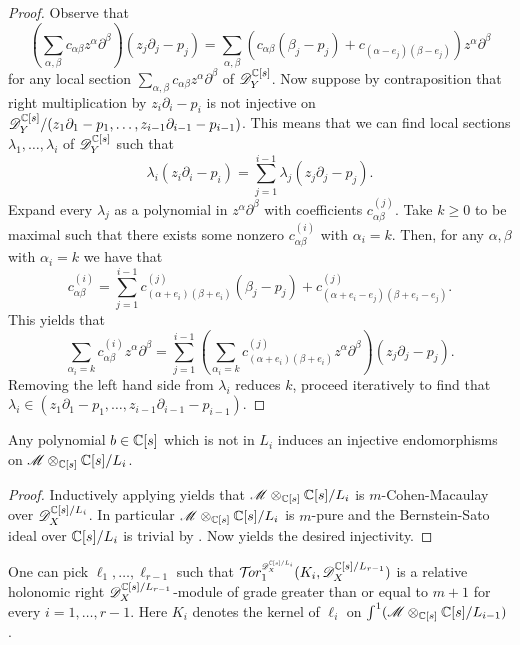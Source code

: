 \begin{proof}
  Observe that
  $$(\sum_{\alpha,\beta} c_{\alpha \beta}z^{\alpha}\partial^{\beta})(z_j\partial_j - p_j) = \sum_{\alpha,\beta} (c_{\alpha \beta}(\beta_j - p_j) + c_{(\alpha - e_j)(\beta - e_j)}) z^\alpha\partial^{\beta}  $$
  for any local section $\sum_{\alpha,\beta} c_{\alpha \beta}z^{\alpha}\partial^{\beta}$ of $\mathscr{D}_Y^{\mathbb{C}[s]}$.
  Now suppose by contraposition that right multiplication by $z_i\partial_i - p_i$ is not injective on $\mathscr{D}_Y^{\mathbb{C}[s]}/(z_1\partial_1 - p_1,\ldots, z_{i-1}\partial_{i-1} - p_{i-1} )$.
  This means that we can find local sections $\lambda_1,\ldots, \lambda_i$ of $\mathscr{D}_Y^{\mathbb{C}[s]}$ such that
  $$\lambda_i (z_i \partial_i - p_i) = \sum_{j = 1}^{i-1}\lambda_j (z_j \partial_j - p_j). $$
  Expand every $\lambda_j$ as a polynomial in $z^\alpha \partial^\beta$ with coefficients $c_{\alpha \beta}^{(j)}$.
  Take $k\geq 0$ to be maximal such that there exists some nonzero $c_{\alpha \beta}^{(i)}$ with $\alpha_i =k$.
  Then, for any $\alpha, \beta$ with $\alpha_i =k$ we have that
  $$c_{\alpha\beta}^{(i)} = \sum_{j = 1}^{i-1} c_{(\alpha + e_i)(\beta + e_i)}^{(j)}(\beta_j - p_j) + c^{(j)}_{(\alpha + e_i - e_j)(\beta + e_i - e_j)}.$$
  This yields that
  $$\sum_{\alpha_i = k} c_{\alpha\beta}^{(i)}z^\alpha \partial^\beta = \sum_{j=1}^{i-1} (\sum_{\alpha_i = k} c_{(\alpha + e_i)(\beta + e_i)}^{(j)}z^{\alpha}\partial^{\beta})(z_j\partial_j - p_j).$$
  Removing the left hand side from $\lambda_i$ reduces $k$, proceed iteratively to find that $\lambda_i \in (z_1\partial_1 - p_1, \ldots, z_{i-1}\partial_{i-1} - p_{i-1})$.
\end{proof}
\begin{corollary}\label{cor: InjectiveEll}
  Any polynomial $b\in \mathbb{C}[s]$ which is not in $L_i$ induces an injective endomorphisms on $\mathscr{M} \otimes_{\mathbb{C}[s]}\mathbb{C}[s]/L_i$.
\end{corollary}
\begin{proof}
  Inductively applying  yields that $\mathscr{M} \otimes_{\mathbb{C}[s]}\mathbb{C}[s]/L_i$ is $m$-Cohen-Macaulay over $\mathscr{D}_X^{\mathbb{C}[s]/L_{i}}$. In particular $\mathscr{M} \otimes_{\mathbb{C}[s]}\mathbb{C}[s]/L_i$ is $m$-pure and the Bernstein-Sato ideal over $\mathbb{C}[s]/L_i$
  is trivial by . Now  yields the desired injectivity.
\end{proof}
\begin{lemma}\label{lem: RelHolTorDegree}
  One can pick $\ell_1,\ldots,\ell_{r-1}$ such that $\Tr{\D_X^{\C[s]/L_{i}} }{1}(K_i, \D_X^{\C[s]/L_{r-1}})$ is a relative holonomic right $\mathscr{D}_X^{\mathbb{C}[s]/L_{r-1}}$-module of grade greater than or equal to $m+1$ for every $i=1,\ldots, r-1$.
  Here $K_i$ denotes the kernel of $\ell_i$ on $\int^1 (\mathscr{M} \otimes_{\mathbb{C}[s]}\mathbb{C}[s]/L_{i-1})$.
\end{lemma}

